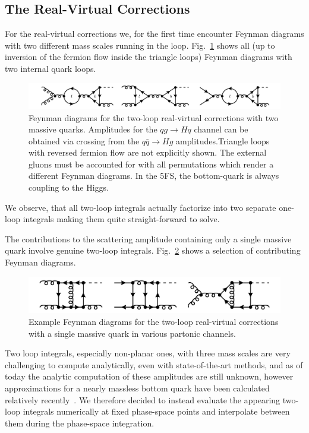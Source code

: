 \subsection{The Real-Virtual Corrections} \label{subsec:5:the_real-virtual_corrections}
For the real-virtual corrections we, for the first time encounter Feynman diagrams with two different mass scales running in the loop. Fig.~\ref{fig:5:real_virtual2} shows all (up to inversion of the fermion flow inside the triangle loops) Feynman diagrams with two internal quark loops.
\begin{figure}[h]
  \centering
  \includegraphics[scale=0.5]{Images/NNLO_Feynman_diagrams/RealVirtual2.pdf}
  \caption{Feynman diagrams for the two-loop real-virtual corrections with two massive quarks. Amplitudes for the $qg \rightarrow Hq$ channel can be obtained via crossing from the $q \bar{q} \rightarrow H g$ amplitudes.Triangle loops with reversed fermion flow are not explicitly shown. The external gluons must be accounted for with all permutations which render a different Feynman diagrams. In the 5\acs{FS}, the bottom-quark is always coupling to the Higgs.}
  \label{fig:5:real_virtual2}
\end{figure}
We observe, that all two-loop integrals actually factorize into two separate one-loop integrals making them quite straight-forward to solve.

The contributions to the scattering amplitude containing only a single massive quark involve genuine two-loop integrals. Fig.~\ref{fig:5:real_virtual1} shows a selection of contributing Feynman diagrams.
\begin{figure}[h]
  \centering
  \includegraphics[width=\figurewidth]{Images/NNLO_Feynman_diagrams/RealVirtual1.pdf}
  \caption{Example Feynman diagrams for the two-loop real-virtual corrections with a single massive quark in various partonic channels.}
  \label{fig:5:real_virtual1}
\end{figure}
Two loop integrals, especially non-planar ones, with three mass scales are very challenging to compute analytically, even with state-of-the-art methods, and as of today the analytic computation of these amplitudes are still unknown, however approximations for a nearly massless bottom quark have been calculated relatively recently~\cite{Melnikov:2016qoc, Melnikov:2017pgf}. We therefore decided to instead evaluate the appearing two-loop integrals numerically at fixed phase-space points and interpolate between them during the phase-space integration.

